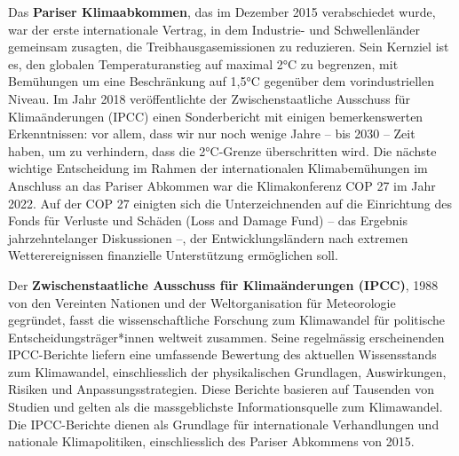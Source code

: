 \documentclass[
  nswissgerman,
  a4paper,
  openany]{book}
\begin{document}
Das \textbf{Pariser Klimaabkommen}, das im Dezember 2015 verabschiedet
wurde, war der erste internationale Vertrag, in dem Industrie- und
Schwellenländer gemeinsam zusagten, die Treibhausgasemissionen zu
reduzieren. Sein Kernziel ist es, den globalen Temperaturanstieg auf
maximal 2°C zu begrenzen, mit Bemühungen um eine Beschränkung auf 1,5°C
gegenüber dem vorindustriellen Niveau. Im Jahr 2018 veröffentlichte der
Zwischenstaatliche Ausschuss für Klimaänderungen (IPCC) einen
Sonderbericht mit einigen bemerkenswerten Erkenntnissen: vor allem, dass
wir nur noch wenige Jahre -- bis 2030 -- Zeit haben, um zu verhindern,
dass die 2°C-Grenze überschritten wird. Die nächste wichtige
Entscheidung im Rahmen der internationalen Klimabemühungen im Anschluss
an das Pariser Abkommen war die Klimakonferenz COP 27 im Jahr 2022. Auf
der COP 27 einigten sich die Unterzeichnenden auf die Einrichtung des
Fonds für Verluste und Schäden (Loss and Damage Fund) -- das Ergebnis
jahrzehntelanger Diskussionen --, der Entwicklungsländern nach extremen
Wetterereignissen finanzielle Unterstützung ermöglichen soll.

\begin{tcolorbox}[enhanced jigsaw, arc=.35mm, bottomrule=.15mm, bottomtitle=1mm, breakable, colback=white, colbacktitle=quarto-callout-note-color!10!white, colframe=quarto-callout-note-color-frame, coltitle=black, left=2mm, leftrule=.75mm, opacityback=0, opacitybacktitle=0.6, rightrule=.15mm, title={Der Zwischenstaatliche Ausschuss für Klimaänderungen (IPCC)}, titlerule=0mm, toprule=.15mm, toptitle=1mm]

Der \textbf{Zwischenstaatliche Ausschuss für Klimaänderungen (IPCC)},
1988 von den Vereinten Nationen und der Weltorganisation für
Meteorologie gegründet, fasst die wissenschaftliche Forschung zum
Klimawandel für politische Entscheidungsträger*innen weltweit zusammen.
Seine regelmässig erscheinenden IPCC-Berichte liefern eine umfassende
Bewertung des aktuellen Wissensstands zum Klimawandel, einschliesslich
der physikalischen Grundlagen, Auswirkungen, Risiken und
Anpassungsstrategien. Diese Berichte basieren auf Tausenden von Studien
und gelten als die massgeblichste Informationsquelle zum Klimawandel.
Die IPCC-Berichte dienen als Grundlage für internationale Verhandlungen
und nationale Klimapolitiken, einschliesslich des Pariser Abkommens von
2015.

\end{tcolorbox}
\end{document}
